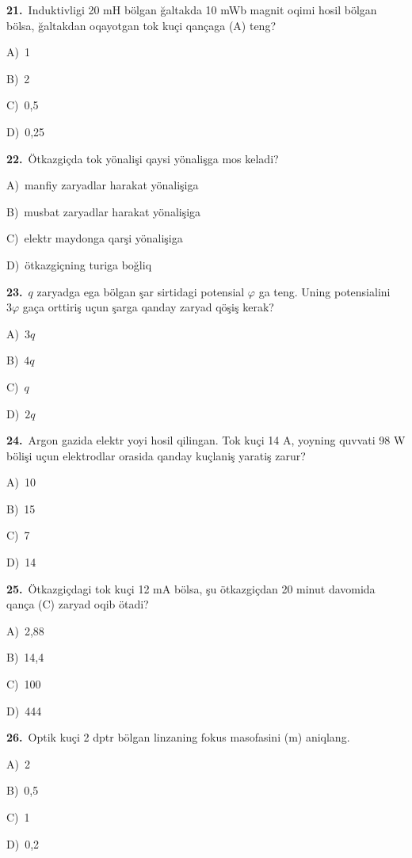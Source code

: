 \documentclass[11pt,a4paper]{article}
\newcommand{\opt}[2]{\hspace*{4mm}#1)\ #2\par}
\begin{document}
\noindent\begin{minipage}{\linewidth}
\textbf{21.}\ Induktivligi 20 mH bölgan ğaltakda 10 mWb magnit oqimi hosil bölgan bölsa, ğaltakdan oqayotgan tok kuçi qançaga (A) teng?\par\smallskip
\opt{A}{1}
\opt{B}{2}
\opt{C}{0,5}
\opt{D}{0,25}
\end{minipage}\vspace{9pt}\par
\noindent\begin{minipage}{\linewidth}
\textbf{22.}\ Ötkazgiçda tok yönalişi qaysi yönalişga mos keladi?\par\smallskip
\opt{A}{manfiy zaryadlar harakat yönalişiga}
\opt{B}{musbat zaryadlar harakat yönalişiga}
\opt{C}{elektr maydonga qarşi yönalişiga}
\opt{D}{ötkazgiçning turiga boğliq}
\end{minipage}\vspace{9pt}\par
\noindent\begin{minipage}{\linewidth}
\textbf{23.}\ $q$ zaryadga ega bölgan şar sirtidagi potensial $\varphi$ ga teng. Uning potensialini $3\varphi$ gaça orttiriş uçun şarga qanday zaryad qöşiş kerak?\par\smallskip
\opt{A}{$3q$}
\opt{B}{$4q$}
\opt{C}{$q$}
\opt{D}{$2q$}
\end{minipage}\vspace{9pt}\par
\noindent\begin{minipage}{\linewidth}
\textbf{24.}\ Argon gazida elektr yoyi hosil qilingan. Tok kuçi 14 A, yoyning quvvati 98 W bölişi uçun elektrodlar orasida qanday kuçlaniş yaratiş zarur?\par\smallskip
\opt{A}{10}
\opt{B}{15}
\opt{C}{7}
\opt{D}{14}
\end{minipage}\vspace{9pt}\par
\noindent\begin{minipage}{\linewidth}
\textbf{25.}\ Ötkazgiçdagi tok kuçi 12 mA bölsa, şu ötkazgiçdan 20 minut davomida qança (C) zaryad oqib ötadi?\par\smallskip
\opt{A}{2,88}
\opt{B}{14,4}
\opt{C}{100}
\opt{D}{444}
\end{minipage}\vspace{9pt}\par
\noindent\begin{minipage}{\linewidth}
\textbf{26.}\ Optik kuçi 2 dptr bölgan linzaning fokus masofasini (m) aniqlang.\par\smallskip
\opt{A}{2}
\opt{B}{0,5}
\opt{C}{1}
\opt{D}{0,2}
\end{minipage}\vspace{9pt}\par
\end{document}
